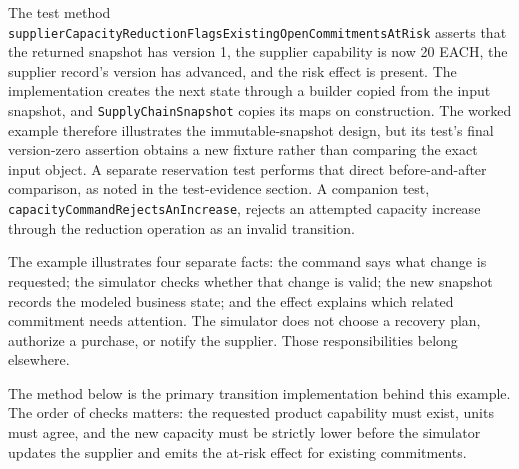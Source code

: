 The test method \texttt{supplierCapacityReductionFlagsExistingOpenCommitmentsAtRisk} asserts that the returned snapshot has version 1, the supplier capability is now 20 EACH, the supplier record's version has advanced, and the risk effect is present. The implementation creates the next state through a builder copied from the input snapshot, and \texttt{SupplyChainSnapshot} copies its maps on construction. The worked example therefore illustrates the immutable-snapshot design, but its test's final version-zero assertion obtains a new fixture rather than comparing the exact input object. A separate reservation test performs that direct before-and-after comparison, as noted in the test-evidence section. A companion test, \texttt{capacityCommandRejectsAnIncrease}, rejects an attempted capacity increase through the reduction operation as an invalid transition.

The example illustrates four separate facts: the command says what change is requested; the simulator checks whether that change is valid; the new snapshot records the modeled business state; and the effect explains which related commitment needs attention. The simulator does not choose a recovery plan, authorize a purchase, or notify the supplier. Those responsibilities belong elsewhere.

The method below is the primary transition implementation behind this example. The order of checks matters: the requested product capability must exist, units must agree, and the new capacity must be strictly lower before the simulator updates the supplier and emits the at-risk effect for existing commitments.

